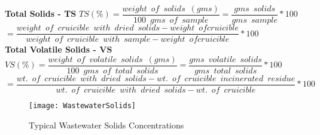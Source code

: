 \vspace{0.4cm}
\textbf{Total Solids - TS}			
\vspace{0.4cm}
$TS(\%)=\dfrac{weight \enspace of \enspace solids \enspace (gms)}{100 \enspace gms \enspace of \enspace sample}=\dfrac{gms \enspace solids}{gms \enspace sample}*100$\\
\vspace{0.3cm}
\hspace{1.2cm}$=\dfrac{weight \enspace of \enspace cruicible \enspace with \enspace dried  \enspace solids - weight \enspace of cruicible}{weight \enspace of \enspace cruicible \enspace with \enspace sample - weight \enspace of cruicible}*100$\\
\vspace{0.4cm}
\textbf{Total Volatile Solids - VS}		
\vspace{0.4cm}
$VS(\%)=\dfrac{weight \enspace of \enspace volatile \enspace solids \enspace (gms)}{100 \enspace gms \enspace of \enspace total \enspace solids}=\dfrac{gms \enspace volatile \enspace solids}{gms \enspace total \enspace solids}*100$\\
\vspace{0.3cm}
\hspace{1.2cm}$=\dfrac{wt. \enspace of \enspace cruicible  \enspace with \enspace dried  \enspace solids - wt. \enspace of \enspace cruicible \enspace incinerated \enspace residue}{wt. \enspace of \enspace cruicible  \enspace with \enspace dried  \enspace solids - wt. \enspace of \enspace cruicible}*100$\\
				\newpage
				\thispagestyle{empty}
				\begin{sidewaysfigure}
					\begin{center}
						\texttt{[image: WastewaterSolids]}\\
						\caption{Typical Wastewater Solids Concentrations}
					\end{center}
				\end{sidewaysfigure}
\newpage
\thispagestyle{empty}

